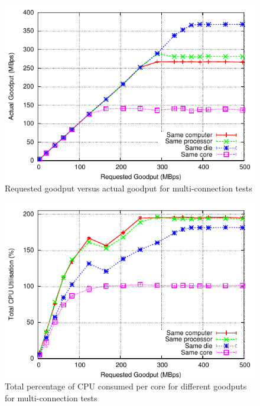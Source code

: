 \documentclass[conference, compsoc]{IEEEtran}
\begin{document}
\begin{figure}[tb]
    \begin{center}
      \includegraphics[height=0.65\columnwidth]{Graphs/intel/two_machines/4_connections/requested_goodput_vs_actual_throughput}
    \end{center}
    \caption{Requested goodput versus actual goodput for multi-connection tests}
    \label{fig:multigoodputs}
\end{figure}

\begin{figure}[tb]
    \begin{center}
      \includegraphics[height=0.65\columnwidth]{Graphs/intel/two_machines/4_connections/requested_goodput_vs_cpu_total}
    \end{center}
    \caption{Total percentage of CPU consumed per core for different goodputs for multi-connection tests}
    \label{fig:multicpuutil}
\end{figure}
\end{document}

